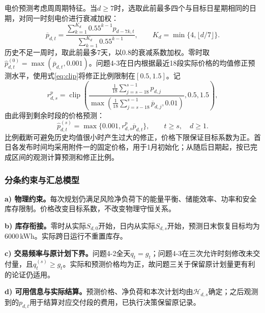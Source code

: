 电价预测考虑周周期特征。当$d\ge7$时，选取此前最多四个与目标日星期相同的日期，对同一时刻电价进行衰减加权：
\begin{equation}
 \overline p_{d,t}=
 \frac{\sum_{k=1}^{K_d}0.55^{k-1}p_{d-7k,t}}
      {\sum_{k=1}^{K_d}0.55^{k-1}},
 \qquad K_d=\min\{4,\lfloor d/7\rfloor\}.
\end{equation}
历史不足一周时，取此前最多7天，以0.8的衰减系数加权。零时取$\widehat p^{(0)}_{d,t}=\max(\overline p_{d,t},0.001)$。问题4-3在日内根据最近18段实际价格的均值修正预测水平，使用式\eqref{eq:clip}将修正比例限制在$[0.5,1.5]$。记
\begin{equation}
 r^{p}_{d,s}=\operatorname{clip}\!\left(
 \frac{\frac1{18}\sum_{j=s-18}^{s-1}p_{d,j}}
      {\max\left(\frac1{18}\sum_{j=s-18}^{s-1}\overline p_{d,j},0.01\right)},
 0.5,1.5\right),
\end{equation}
由此得到剩余时段的价格预测：
\begin{equation}
 \widehat p^{(s)}_{d,t}=\max\{0.001,r^{p}_{d,s}\overline p_{d,t}\},
 \qquad t\ge s,\quad d\ge1.\label{eq:price-update}
\end{equation}
比例截断可避免历史均值很小时产生过大的修正，价格下限保证目标系数为正。首日各发布时间均采用附件一的固定价格，用于1月初始化；从随后日期起，按已完成区间的观测计算预测和修正比例。

\subsubsection{分条约束与汇总模型}
\textbf{a) 物理约束。}每次规划仍满足风险净负荷下的能量平衡、储能效率、功率和安全库存限制。价格改变目标系数，不改变物理守恒关系。

\textbf{b) 库存衔接。}零时从实际$S_{d,0}$开始，日内从实际$S_{d,s}$开始，预测日末恢复目标均为6000\,kWh。实际跨日运行不重置库存。

\textbf{c) 交易频率与原计划下界。}问题4-2全天$q_t=g_t$；问题4-3在三次允许时刻修改未交付量，且$q^{(s)}_t\ge g_t$。实际和预测价格均为正，故问题三关于保留原计划量更有利的论证仍适用。

\textbf{d) 可用信息与实际结算。}预测价格、净负荷和本次计划均由$\mathcal H_{d,s}$确定；之后观测到的$p_{d,t}$用于结算对应交付段的费用，已执行决策保留原记录。

